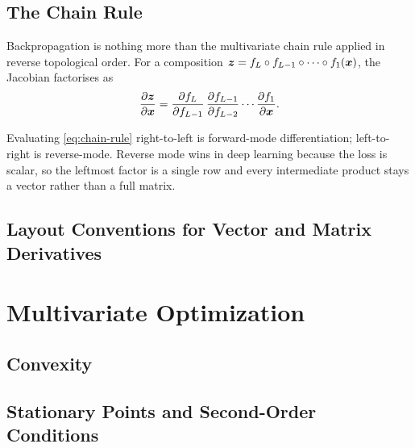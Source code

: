 \subsection{The Chain Rule}

Backpropagation is nothing more than the multivariate chain rule applied in
reverse topological order. For a composition
$\bm{z} = f_L \circ f_{L-1} \circ \dots \circ f_1(\bm{x})$, the Jacobian
factorises as
%
\begin{equation}
    \frac{\partial \bm{z}}{\partial \bm{x}}
        = \frac{\partial f_L}{\partial f_{L-1}} \, \frac{\partial f_{L-1}}{\partial f_{L-2}} \cdots \frac{\partial f_1}{\partial \bm{x}} .
    \label{eq:chain-rule}
\end{equation}

\begin{remark}
    Evaluating \cref{eq:chain-rule} right-to-left is forward-mode
    differentiation; left-to-right is reverse-mode. Reverse mode wins in deep
    learning because the loss is scalar, so the leftmost factor is a single row
    and every intermediate product stays a vector rather than a full matrix.
\end{remark}

\subsection{Layout Conventions for Vector and Matrix Derivatives}


\section{Multivariate Optimization}
\label{sec:optimization}


\subsection{Convexity}

\subsection{Stationary Points and Second-Order Conditions}

